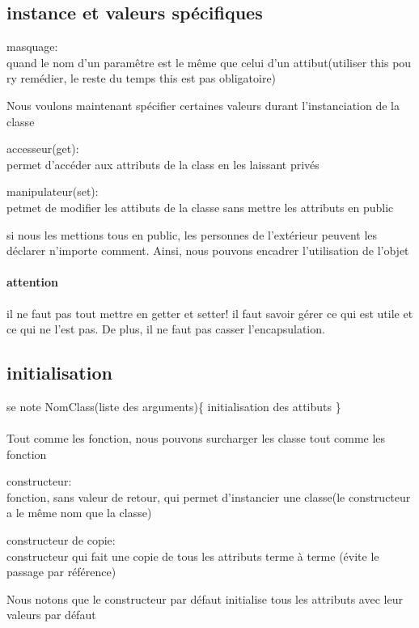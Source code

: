 \documentclass[a4paper,10pt]{article}
\begin{document}
\subsection{instance et valeurs spécifiques}
\begin{description}
 \item masquage:\\{quand le nom d'un paramêtre est le même que celui d'un attibut(utiliser this pou ry remédier, le reste du temps this est pas obligatoire)}
\end{description}

Nous voulons maintenant spécifier certaines valeurs durant l'instanciation de la classe
\begin{description}
 \item accesseur(get):\\{permet d'accéder aux attributs de la class en les laissant privés}
 \item manipulateur(set):\\{petmet de modifier les attibuts de la classe sans mettre les attributs en public}
\end{description}
si nous les mettions tous en public, les personnes de l'extérieur peuvent les déclarer n'importe comment. Ainsi, nous pouvons encadrer l'utilisation 
 de l'objet
\paragraph{attention}
il ne faut pas tout mettre en getter et setter! il faut savoir gérer ce qui est utile et ce qui ne l'est pas. De plus, il ne faut pas casser 
 l'encapsulation.
\subsection{initialisation}
se note NomClass(liste des arguments)\{
\newline
initialisation des attibuts
\newline
\}
\paragraph{}
Tout comme les fonction, nous pouvons surcharger les classe tout comme les fonction
\newline
\begin{description}
 \item constructeur:\\{fonction, sans valeur de retour, qui permet d'instancier une classe(le constructeur a le même nom que la classe)}
 \item constructeur de copie:\\{constructeur qui fait une copie de tous les attributs terme à terme (évite le passage par référence)}
 \end{description}
Nous notons que le constructeur par défaut initialise tous les attributs avec leur valeurs par défaut
\end{document}
